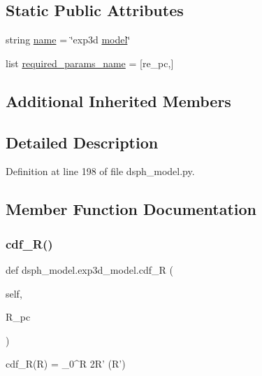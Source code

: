 \subsection*{Static Public Attributes}
\begin{DoxyCompactItemize}
\item 
string \hyperlink{classdsph__model_1_1exp3d__model_aa4b03ab39c5b9408f14b2ca594f8aebd}{name} = \char`\"{}exp3d \hyperlink{classdsph__model_1_1model}{model}\char`\"{}
\item 
list \hyperlink{classdsph__model_1_1exp3d__model_ac16452f520447380ccd798b53538aed1}{required\+\_\+params\+\_\+name} = \mbox{[}\textquotesingle{}re\+\_\+pc\textquotesingle{},\mbox{]}
\end{DoxyCompactItemize}
\subsection*{Additional Inherited Members}


\subsection{Detailed Description}


Definition at line 198 of file dsph\+\_\+model.\+py.



\subsection{Member Function Documentation}
\mbox{\label{classdsph__model_1_1exp3d__model_a5720f3c3c46a00563c388a4f70daba0e}} 
\subsubsection{\texorpdfstring{cdf\+\_\+\+R()}{cdf\_R()}}
{\footnotesize\ttfamily def dsph\+\_\+model.\+exp3d\+\_\+model.\+cdf\+\_\+R (\begin{DoxyParamCaption}\item[{}]{self,  }\item[{}]{R\+\_\+pc }\end{DoxyParamCaption})}

\begin{DoxyVerb}cdf_R(R) = \int_0^R  2\pi R' \Sigma(R')
\end{DoxyVerb}
 

